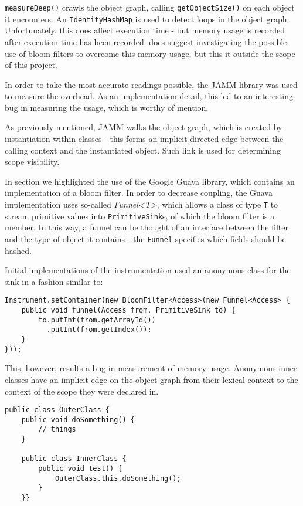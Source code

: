 	\texttt{measureDeep()} crawls the object graph, calling \texttt{getObjectSize()} on each object it encounters. An \texttt{IdentityHashMap} is used to detect loops in the object graph. Unfortunately, this does affect execution time - but memory usage is recorded after execution time has been recorded. \citeauthor{JAMM} does suggest investigating the possible use of bloom filters to overcome this memory usage, but this it outside the scope of this project.
	
	In order to take the most accurate readings possible, the JAMM library was used to measure the overhead. As an implementation detail, this led to an interesting bug in measuring the usage, which is worthy of mention.
	
	As previously mentioned, JAMM walks the object graph, which is created by instantiation within classes - this forms an implicit directed edge between the calling context and the instantiated object. Such link is used for determining scope visibility.
	
	In section we highlighted the use of the Google Guava library, which contains an implementation of a bloom filter. In order to decrease coupling, the Guava implementation uses so-called \textit{Funnel<T>}, which allows a class of type \texttt{T} to stream primitive values into \texttt{PrimitiveSink}s, of which the bloom filter is a member. In this way, a funnel can be thought of an interface between the filter and the type of object it contains - the \texttt{Funnel} specifies which fields should be hashed.
	
	Initial implementations of the instrumentation used an anonymous class for the sink in a fashion similar to:
	
	\begin{lstlisting}
Instrument.setContainer(new BloomFilter<Access>(new Funnel<Access> {
    public void funnel(Access from, PrimitiveSink to) {
        to.putInt(from.getArrayId())
          .putInt(from.getIndex());
    }
}));\end{lstlisting}
	
	This, however, results a bug in measurement of memory usage. Anonymous inner classes have an implicit edge on the object graph from their lexical context to the context of the scope they were declared in.
	
	\begin{lstlisting}
public class OuterClass {
    public void doSomething() {
        // things
    }
	
    public class InnerClass {
        public void test() {
            OuterClass.this.doSomething();
        }
    }}\end{lstlisting}
	
